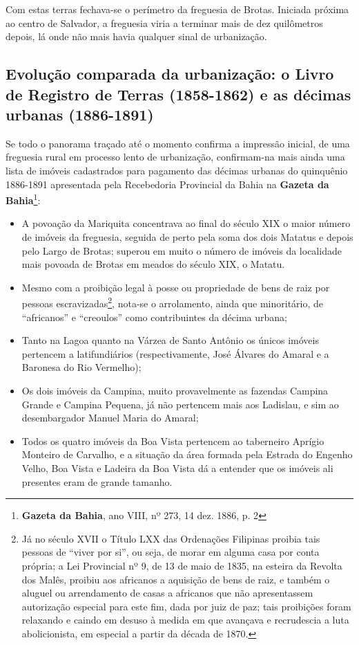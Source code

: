 Com estas terras fechava-se o perímetro da freguesia de Brotas. Iniciada próxima ao centro de Salvador, a freguesia viria a terminar mais de dez quilômetros depois, lá onde não mais havia qualquer sinal de urbanização.

\subsection{Evolução comparada da urbanização: o Livro de Registro de Terras (1858-1862) e as décimas urbanas (1886-1891)}

Se todo o panorama traçado até o momento confirma a impressão inicial, de uma freguesia rural em processo lento de urbanização, confirmam-na mais ainda uma lista de imóveis cadastrados para pagamento das décimas urbanas do quinquênio 1886-1891 apresentada pela Recebedoria Provincial da Bahia na \textbf{Gazeta da Bahia}\footnote{\textbf{Gazeta da Bahia}, ano VIII, nº 273, 14 dez. 1886, p. 2}:



\begin{itemize}
\item A povoação da Mariquita concentrava ao final do século XIX o maior número de imóveis da freguesia, seguida de perto pela soma dos dois Matatus e depois pelo Largo de Brotas; superou em muito o número de imóveis da localidade mais povoada de Brotas em meados do século XIX, o Matatu.
\item Mesmo com a proibição legal à posse ou propriedade de bens de raiz por pessoas escravizadas\footnote{Já no século XVII o Título LXX das Ordenações Filipinas proibia tais pessoas de ``viver por si'', ou seja, de morar em alguma casa por conta própria; a Lei Provincial nº 9, de 13 de maio de 1835, na esteira da Revolta dos Malês, proibiu aos africanos a aquisição de bens de raiz, e também o aluguel ou arrendamento de casas a africanos que não apresentassem autorização especial para este fim, dada por juiz de paz; tais proibições foram relaxando e caindo em desuso à medida em que avançava e recrudescia a luta abolicionista, em especial a partir da década de 1870.}, nota-se o arrolamento, ainda que minoritário, de ``africanos'' e ``creoulos'' como contribuintes da décima urbana;
\item Tanto na Lagoa quanto na Várzea de Santo Antônio os únicos imóveis pertencem a latifundiários (respectivamente, José Álvares do Amaral e a Baronesa do Rio Vermelho);
\item Os dois imóveis da Campina, muito provavelmente as fazendas Campina Grande e Campina Pequena, já não pertencem mais aos Ladislau, e sim ao desembargador Manuel Maria do Amaral;
\item Todos os quatro imóveis da Boa Vista pertencem ao taberneiro Aprígio Monteiro de Carvalho, e a situação da área formada pela Estrada do Engenho Velho, Boa Vista e Ladeira da Boa Vista dá a entender que os imóveis ali presentes eram de grande tamanho.
\end{itemize}

